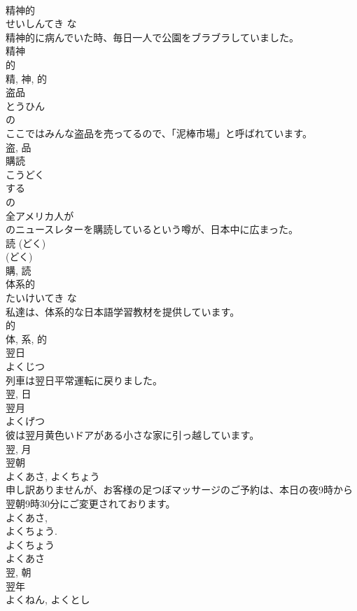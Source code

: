 \documentclass[8pt]{extreport}
\begin{document}
\begin{CJK}{UTF8}{min}
\\	精神的	
\\	せいしんてき	な 
\\	精神的に病んでいた時、毎日一人で公園をブラブラしていました。	
\\	精神 
\\	的 
\\	精, 神, 的	
\\	盗品	
\\	とうひん	
\\	の 
\\	ここではみんな盗品を売ってるので、「泥棒市場」と呼ばれています。	
\\	盗, 品	
\\	購読	
\\	こうどく	
\\	する 
\\	の 
\\	全アメリカ人が
\\	のニュースレターを購読しているという噂が、日本中に広まった。	
\\	読 (どく) 
\\	(どく) 
\\	購, 読	
\\	体系的	
\\	たいけいてき	な 
\\	私達は、体系的な日本語学習教材を提供しています。	
\\	的 
\\	体, 系, 的	
\\	翌日	
\\	よくじつ	
\\	列車は翌日平常運転に戻りました。	
\\	翌, 日	
\\	翌月	
\\	よくげつ	
\\	彼は翌月黄色いドアがある小さな家に引っ越しています。	
\\	翌, 月	
\\	翌朝	
\\	よくあさ, よくちょう	
\\	申し訳ありませんが、お客様の足つぼマッサージのご予約は、本日の夜9時から翌朝9時30分にご変更されております。	
\\	よくあさ, 
\\	よくちょう. 
\\	よくちょう 
\\	よくあさ 
\\	翌, 朝	
\\	翌年	
\\	よくねん, よくとし	

\end{CJK}
\end{document}
